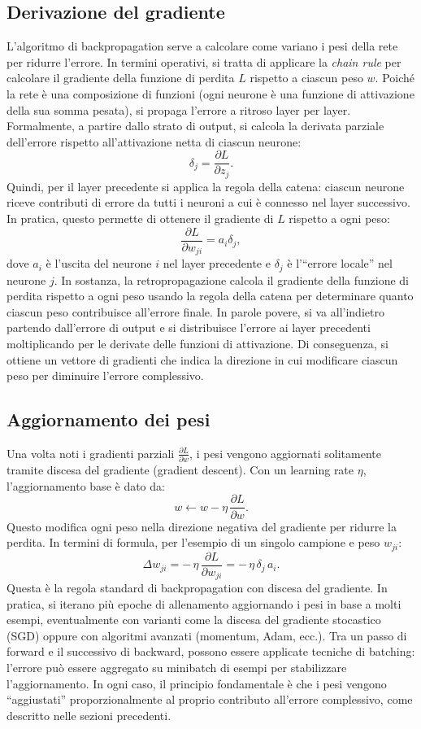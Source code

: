 \documentclass[a4paper,12pt]{report}
\begin{document}
	\subsection{Derivazione del gradiente}
	L'algoritmo di backpropagation serve a calcolare come variano i pesi della rete per ridurre l'errore. In termini operativi, si tratta di applicare la \emph{chain rule} per calcolare il gradiente della funzione di perdita $L$ rispetto a ciascun peso $w$. Poiché la rete è una composizione di funzioni (ogni neurone è una funzione di attivazione della sua somma pesata), si propaga l'errore a ritroso layer per layer. Formalmente, a partire dallo strato di output, si calcola la derivata parziale dell'errore rispetto all'attivazione netta di ciascun neurone:
	\[
	\delta_j = \frac{\partial L}{\partial z_j}.
	\]
	Quindi, per il layer precedente si applica la regola della catena: ciascun neurone riceve contributi di errore da tutti i neuroni a cui è connesso nel layer successivo. In pratica, questo permette di ottenere il gradiente di $L$ rispetto a ogni peso:
	\[
	\frac{\partial L}{\partial w_{ji}} = a_i \delta_j,
	\]
	dove $a_i$ è l'uscita del neurone $i$ nel layer precedente e $\delta_j$ è l'``errore locale'' nel neurone $j$. In sostanza, la retropropagazione calcola il gradiente della funzione di perdita rispetto a ogni peso usando la regola della catena per determinare quanto ciascun peso contribuisce all'errore finale. In parole povere, si va all'indietro partendo dall'errore di output e si distribuisce l'errore ai layer precedenti moltiplicando per le derivate delle funzioni di attivazione. Di conseguenza, si ottiene un vettore di gradienti che indica la direzione in cui modificare ciascun peso per diminuire l'errore complessivo.
	
	\subsection{Aggiornamento dei pesi}
	Una volta noti i gradienti parziali $\frac{\partial L}{\partial w}$, i pesi vengono aggiornati solitamente tramite discesa del gradiente (gradient descent). Con un learning rate $\eta$, l'aggiornamento base è dato da:
	\[
	w \leftarrow w - \eta\,\frac{\partial L}{\partial w}.
	\]
	Questo modifica ogni peso nella direzione negativa del gradiente per ridurre la perdita. In termini di formula, per l'esempio di un singolo campione e peso $w_{ji}$:
	\[
	\Delta w_{ji} = -\,\eta\,\frac{\partial L}{\partial w_{ji}} = -\,\eta\,\delta_j\,a_i.
	\]
	Questa è la regola standard di backpropagation con discesa del gradiente. In pratica, si iterano più epoche di allenamento aggiornando i pesi in base a molti esempi, eventualmente con varianti come la discesa del gradiente stocastico (SGD) oppure con algoritmi avanzati (momentum, Adam, ecc.). Tra un passo di forward e il successivo di backward, possono essere applicate tecniche di batching: l'errore può essere aggregato su minibatch di esempi per stabilizzare l'aggiornamento. In ogni caso, il principio fondamentale è che i pesi vengono ``aggiustati'' proporzionalmente al proprio contributo all'errore complessivo, come descritto nelle sezioni precedenti.
	
\end{document}
